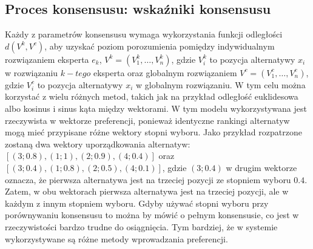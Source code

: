 \subsection{Proces konsensusu: wskaźniki konsensusu}
Każdy z parametrów konsensusu wymaga wykorzystania funkcji odległości
$d(V^k,V^c)$, aby uzyskać poziom porozumienia pomiędzy indywidualnym
rozwiązaniem eksperta $e_k$, $V^k = (V^k_1, \dotsc, V^k_n)$, gdzie $V^k_i$ to
pozycja alternatywy $x_i$ w rozwiązaniu $k-tego$ eksperta oraz globalnym
rozwiązaniem $V^c = (V^c_1, \dotsc, V^c_n)$, gdzie $V^c_i$ to pozycja
alternatywy $x_i$ w globalnym rozwiązaniu. W tym celu można korzystać z wielu
różnych metod, takich jak na przykład odległość euklidesowa albo kosinus i sinus
kąta między wektorami. W tym modelu wykorzystywana jest rzeczywista w wektorze preferencji, ponieważ identyczne rankingi alternatyw
mogą mieć przypisane różne wektory stopni wyboru. Jako przykład rozpatrzone zostaną dwa
wektory uporządkowania alternatyw: $[(3;0.8), (1;1), (2;0.9), (4;0.4)]$ oraz
$[(3;0.4), (1;0.8), (2;0.5), (4;0.1)]$, gdzie $(3; 0.4)$ w drugim wektorze
oznacza, że pierwsza alternatywa jest na trzeciej pozycji ze stopniem wyboru
$0.4$. Zatem, w obu wektorach pierwsza alternatywa jest na trzeciej pozycji, ale
w każdym z innym stopniem wyboru. Gdyby używać stopni wyboru przy porównywaniu
konsensusu to można by mówić o pełnym konsensusie, co jest w rzeczywistości
bardzo trudne do osiągnięcia. Tym bardziej, że w systemie wykorzystywane są
różne metody wprowadzania preferencji.

